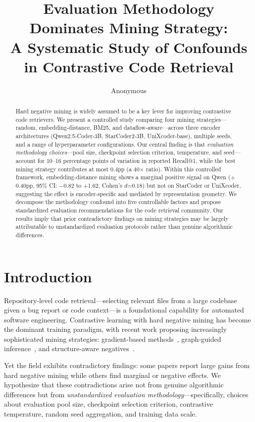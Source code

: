 \documentclass[11pt]{article}
\title{Evaluation Methodology Dominates Mining Strategy:\\A Systematic Study of Confounds in Contrastive Code Retrieval}
\author{Anonymous}
\date{}
\begin{document}
\maketitle

\begin{abstract}
Hard negative mining is widely assumed to be a key lever for improving contrastive code retrievers. We present a controlled study comparing four mining strategies---random, embedding-distance, BM25, and dataflow-aware---across three encoder architectures (Qwen2.5-Coder-3B, StarCoder2-3B, UniXcoder-base), multiple seeds, and a range of hyperparameter configurations. Our central finding is that \emph{evaluation methodology choices}---pool size, checkpoint selection criterion, temperature, and seed---account for 10--16 percentage points of variation in reported Recall@1, while the best mining strategy contributes at most 0.4pp (a 40$\times$ ratio). Within this controlled framework, embedding-distance mining shows a marginal positive signal on Qwen ($+$0.40pp, 95\% CI: $-$0.82 to $+$1.62, Cohen's $d$=0.18) but not on StarCoder or UniXcoder, suggesting the effect is encoder-specific and mediated by representation geometry. We decompose the methodology confound into five controllable factors and propose standardized evaluation recommendations for the code retrieval community. Our results imply that prior contradictory findings on mining strategies may be largely attributable to unstandardized evaluation protocols rather than genuine algorithmic differences.
\end{abstract}

\section{Introduction}

Repository-level code retrieval---selecting relevant files from a large codebase given a bug report or code context---is a foundational capability for automated software engineering. Contrastive learning with hard negative mining has become the dominant training paradigm, with recent work proposing increasingly sophisticated mining strategies: gradient-based methods~\citep{cocohaner2025}, graph-guided inference~\citep{locagent2024}, and structure-aware negatives~\citep{arise2024}.

Yet the field exhibits contradictory findings: some papers report large gains from hard negative mining while others find marginal or negative effects. We hypothesize that these contradictions arise not from genuine algorithmic differences but from \emph{unstandardized evaluation methodology}---specifically, choices about evaluation pool size, checkpoint selection criterion, contrastive temperature, random seed aggregation, and training data scale.
\end{document}
